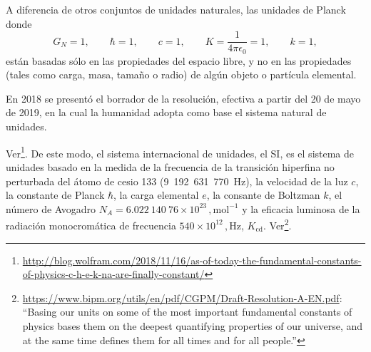 A diferencia de otros conjuntos de unidades naturales, las unidades de Planck donde
\begin{equation}
\label{eq:144}
  G_N=1,\qquad \hbar=1,\qquad c=1,\qquad K=\frac{1}{4\pi\epsilon_0}=1,\qquad k=1,
\end{equation}
están basadas sólo en las propiedades del espacio libre, y no en las propiedades (tales como carga, masa, tamaño o radio) de algún objeto o partícula elemental. 
\begin{frame}
En 2018 se presentó el borrador de la resolución, efectiva a partir del 20 de mayo  de 2019, en la cual la humanidad adopta como base el sistema natural de unidades.
\end{frame}
Ver\footnote{\url{http://blog.wolfram.com/2018/11/16/as-of-today-the-fundamental-constants-of-physics-c-h-e-k-na-are-finally-constant/}}. De este modo, el sistema internacional  de unidades, el SI, es el sistema de unidades basado en la medida de la frecuencia de la transición hiperfina no perturbada del átomo de cesio 133 (9~192~631~770~Hz), la velocidad de la luz $c$, la constante de Planck $\hbar$, la carga elemental $e$, la consante de Boltzman $k$, el número de Avogadro $N_A=6.022~140~76\times 10^{23}\,,\text{mol}^{-1}$ y la eficacia luminosa de la radiación monocromática de frecuencia $540\times 10^{12}\,,\text{Hz}$, $K_{\text{cd}}$. Ver\footnote{\url{https://www.bipm.org/utils/en/pdf/CGPM/Draft-Resolution-A-EN.pdf}: ``Basing our units on some of the most important fundamental constants of physics bases them on the deepest quantifying properties of our universe, and at the same time defines them for all times and for all people.''}.

